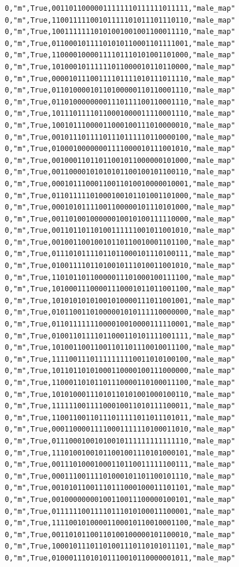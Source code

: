 \documentclass[authoryearcitations]{UoYCSproject}
\begin{document}
\begin{framed}
\begin{verbatim}
0,"m",True,00110110000011111110111111011111,"male_map"
0,"m",True,11001111100101111101011101110110,"male_map"
0,"m",True,10011111110101001001001100011110,"male_map"
0,"m",True,01100010111101010110001101111001,"male_map"
0,"m",True,11000010000111101110101001101000,"male_map"
0,"m",True,10100010111111011000010110110000,"male_map"
0,"m",True,00001011100111101111010111011110,"male_map"
0,"m",True,01101000010110100000110110001110,"male_map"
0,"m",True,01101000000001110111100110001110,"male_map"
0,"m",True,10111011110110001000011110001110,"male_map"
0,"m",True,10010111000011000100111010000010,"male_map"
0,"m",True,00101110111101110111110110000100,"male_map"
0,"m",True,01000100000001111000010111001010,"male_map"
0,"m",True,00100011011011001011000000101000,"male_map"
0,"m",True,00110000101010101100100101100110,"male_map"
0,"m",True,00010111000110011010010000010001,"male_map"
0,"m",True,01101111101000100101101001101000,"male_map"
0,"m",True,00010101111001100000101110101000,"male_map"
0,"m",True,00110100100000010010100111110000,"male_map"
0,"m",True,00110110110100111111001011001010,"male_map"
0,"m",True,00100110010010110110010001101100,"male_map"
0,"m",True,01110101111011011000101110100111,"male_map"
0,"m",True,01001111011010010111010011001010,"male_map"
0,"m",True,11010110110000011101000100111100,"male_map"
0,"m",True,10100011100001110001011011001100,"male_map"
0,"m",True,10101010101001010000111011001001,"male_map"
0,"m",True,01011001101000001010111110000000,"male_map"
0,"m",True,01101111111000010010000111110001,"male_map"
0,"m",True,01001101111011000110101111001111,"male_map"
0,"m",True,10100110011001101101110010011100,"male_map"
0,"m",True,11110011101111111110011010100100,"male_map"
0,"m",True,10110110101000110000100111000000,"male_map"
0,"m",True,11000110101101110000110100011100,"male_map"
0,"m",True,10101000111010110101001000100110,"male_map"
0,"m",True,11111100111100010011010111100011,"male_map"
0,"m",True,11001100110111011111011011101011,"male_map"
0,"m",True,00011000011110001111110100011010,"male_map"
0,"m",True,01110001001010010111111111111110,"male_map"
0,"m",True,11101001001011001001110101000101,"male_map"
0,"m",True,00111010001000110110011111100111,"male_map"
0,"m",True,00011100111101000101101100101110,"male_map"
0,"m",True,00101011001110111000100011101101,"male_map"
0,"m",True,00100000000100110011100000100101,"male_map"
0,"m",True,01111110011110111010100011100001,"male_map"
0,"m",True,11110010100001100010110010001100,"male_map"
0,"m",True,00110101100110100100000101100010,"male_map"
0,"m",True,10001011101101001110110101011101,"male_map"
0,"m",True,01000111010101110010110000001011,"male_map"

\end{verbatim}
\end{framed}
\end{document}
